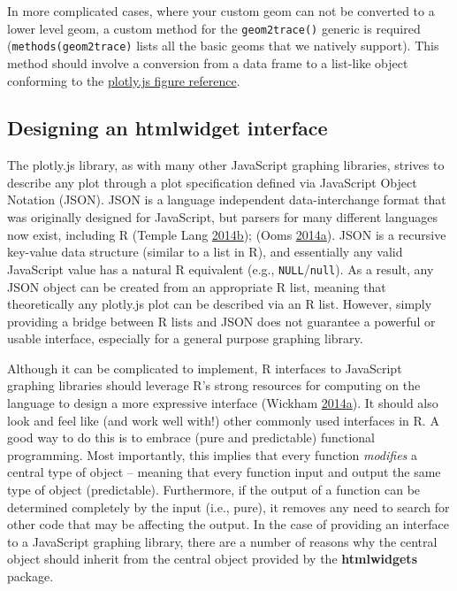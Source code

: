 \documentclass[12pt,]{isuthesis}
\begin{document}
In more complicated cases, where your custom geom can not be converted
to a lower level geom, a custom method for the \texttt{geom2trace()}
generic is required (\texttt{methods(geom2trace)} lists all the basic
geoms that we natively support). This method should involve a conversion
from a data frame to a list-like object conforming to the
\href{https://plot.ly/r/reference}{plotly.js figure reference}.

\subsection{Designing an htmlwidget
interface}\label{designing-an-htmlwidget-interface}

The plotly.js library, as with many other JavaScript graphing libraries,
strives to describe any plot through a plot specification defined via
JavaScript Object Notation (JSON). JSON is a language independent
data-interchange format that was originally designed for JavaScript, but
parsers for many different languages now exist, including R (Temple Lang
\protect\hyperlink{ref-RJSONIO}{2014}\protect\hyperlink{ref-RJSONIO}{b});
(Ooms
\protect\hyperlink{ref-jsonlite}{2014}\protect\hyperlink{ref-jsonlite}{a}).
JSON is a recursive key-value data structure (similar to a list in R),
and essentially any valid JavaScript value has a natural R equivalent
(e.g., \texttt{NULL}/\texttt{null}). As a result, any JSON object can be
created from an appropriate R list, meaning that theoretically any
plotly.js plot can be described via an R list. However, simply providing
a bridge between R lists and JSON does not guarantee a powerful or
usable interface, especially for a general purpose graphing library.

Although it can be complicated to implement, R interfaces to JavaScript
graphing libraries should leverage R's strong resources for computing on
the language to design a more expressive interface (Wickham
\protect\hyperlink{ref-adv-r}{2014}\protect\hyperlink{ref-adv-r}{a}). It
should also look and feel like (and work well with!) other commonly used
interfaces in R. A good way to do this is to embrace (pure and
predictable) functional programming. Most importantly, this implies that
every function \emph{modifies} a central type of object -- meaning that
every function input and output the same type of object (predictable).
Furthermore, if the output of a function can be determined completely by
the input (i.e., pure), it removes any need to search for other code
that may be affecting the output. In the case of providing an interface
to a JavaScript graphing library, there are a number of reasons why the
central object should inherit from the central object provided by the
\textbf{htmlwidgets} package.
\end{document}
